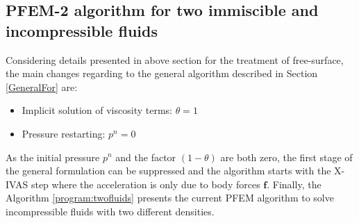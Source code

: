 \subsection{PFEM-2 algorithm for two immiscible and incompressible fluids}

Considering details presented in above section for the treatment of free-surface, the main changes regarding to the general algorithm described in Section \ref{GeneralFor} are:
\begin{itemize}
  \item Implicit solution of viscosity terms: $\theta=1$
  \item Pressure restarting: $p^n=0$
\end{itemize}
As the initial pressure $p^n$ and the factor $(1-\theta)$ are both zero, the first stage of the general formulation can be suppressed and the algorithm starts with the X-IVAS step where the acceleration is only due to body forces $\mathbf{f}$. Finally, the Algorithm \ref{program:twofluids} presents the current PFEM algorithm to solve incompressible fluids with two different densities.

